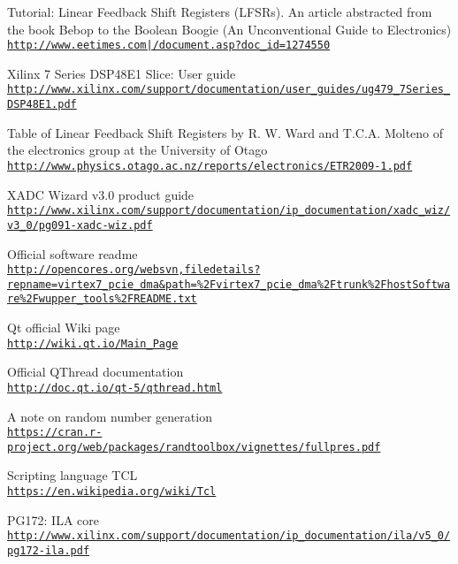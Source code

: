 \begin{thebibliography}{9}
	Tutorial: Linear Feedback Shift Registers (LFSRs). An article abstracted from the book Bebop to the Boolean Boogie (An Unconventional Guide to Electronics)\\
	\href{http://www.eetimes.com/document.asp?doc_id=1274550}{\nolinkurl{http://www.eetimes.com|/document.asp?doc\_id=1274550}}
	
	Xilinx 7 Series DSP48E1 Slice: User guide\\
	\href{http://www.xilinx.com/support/documentation/user_guides/ug479_7Series_DSP48E1.pdf}{\nolinkurl{http://www.xilinx.com/support/documentation/user\_guides/ug479\_7Series\_DSP48E1.pdf}}

	Table of Linear Feedback Shift Registers by R. W. Ward and T.C.A. Molteno of the electronics group at the University of Otago\\
	\href{http://www.physics.otago.ac.nz/reports/electronics/ETR2009-1.pdf}{\nolinkurl{http://www.physics.otago.ac.nz/reports/electronics/ETR2009-1.pdf}}
	
	XADC Wizard v3.0 product guide\\
	\href{http://www.xilinx.com/support/documentation/ip_documentation/xadc_wiz/v3_0/pg091-xadc-wiz.pdf}{\nolinkurl{http://www.xilinx.com/support/documentation/ip\_documentation/xadc\_wiz/v3\_0/pg091-xadc-wiz.pdf}}
	
		Official software readme\\
		\href{http://opencores.org/websvn,filedetails?repname=virtex7\_pcie\_dma&path=\%2Fvirtex7_pcie_dma\%2Ftrunk\%2FhostSoftware\%2Fwupper_tools\%2FREADME.txt}{\nolinkurl{http://opencores.org/websvn,filedetails?repname=virtex7_pcie_dma&path=\%2Fvirtex7_pcie_dma\%2Ftrunk\%2FhostSoftware\%2Fwupper_tools\%2FREADME.txt}}	
	
	Qt official Wiki page\\
	\href{http://wiki.qt.io/Main_Page}{\nolinkurl{http://wiki.qt.io/Main\_Page}}
	
	Official QThread documentation\\
	\href{http://doc.qt.io/qt-5/qthread.html}{\nolinkurl{http://doc.qt.io/qt-5/qthread.html}}
	
	A note on random number generation\\
	\href{https://cran.r-project.org/web/packages/randtoolbox/vignettes/fullpres.pdf}{\nolinkurl{https://cran.r-project.org/web/packages/randtoolbox/vignettes/fullpres.pdf}}
	
	Scripting language TCL\\
	\href{https://en.wikipedia.org/wiki/Tcl}{\nolinkurl{https://en.wikipedia.org/wiki/Tcl}}
	
	
	PG172: ILA core\\
	\href{http://www.xilinx.com/support/documentation/ip_documentation/ila/v5_0/pg172-ila.pdf}{\nolinkurl{http://www.xilinx.com/support/documentation/ip\_documentation/ila/v5\_0/pg172-ila.pdf}}
	

	
	
	
	
\end{thebibliography}
\newpage